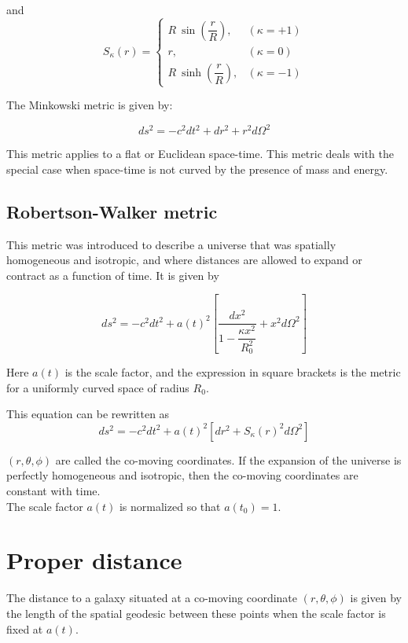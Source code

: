 \documentclass[a4,12pt,oneside]{report}
\begin{document}
	and 
	\begin{equation}
		S_\kappa(r)=\begin{cases}R\:\sin\left(\dfrac{r}{R}\right),   &(\kappa=+1) \\
		r,  &(\kappa=0) \\
		R\:\sinh\left(\dfrac{r}{R}\right),  &(\kappa=-1)
		\end{cases}
	\end{equation}
	
	The Minkowski metric is given by:
	
	\begin{equation}
		ds^2=-c^2dt^2+dr^2+r^2d\Omega^2
	\end{equation}
	
	This metric applies to a flat or Euclidean space-time. This metric deals with the special case when space-time is not curved by the presence of mass and energy.
	
	\subsection{Robertson-Walker metric}
	
	This metric was introduced to describe a universe that was spatially homogeneous and isotropic, and where distances are allowed to expand or contract as a function of time. It is given by
	
	\begin{equation}
		ds^2=-c^2dt^2+a(t)^2\left[\frac{dx^2}{1-\dfrac{\kappa x^2}{R_0^2}} +x^2d\Omega^2\right]
	\end{equation}
	
	Here $a(t)$ is the scale factor, and the expression in square brackets is the metric for a uniformly curved space of radius $R_0$.

	This equation can be rewritten as 
	\begin{equation}
		ds^2=-c^2dt^2+a(t)^2[dr^2+S_\kappa(r)^2d\Omega^2]
	\end{equation}
	
	$ (r,\theta, \phi) $ are called the co-moving coordinates. If the expansion of the universe is perfectly homogeneous and isotropic, then the co-moving coordinates are constant with time. \\
	
	The scale factor $ a(t) $ is normalized so that $ a(t_0) =1$.
	
	\section{Proper distance}
	The distance to a galaxy situated at a co-moving coordinate $ (r,\theta,\phi) $ is given by the length of the spatial geodesic between these points when the scale factor is fixed at $ a(t) $. \\
	
\end{document}
